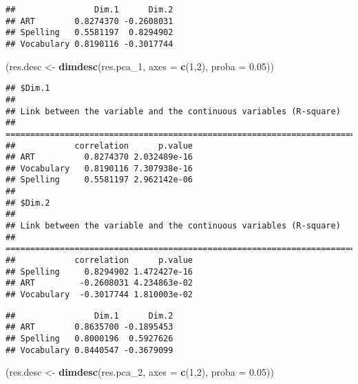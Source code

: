 \documentclass[
]{article}
\newenvironment{Shaded}{\begin{snugshade}}{\end{snugshade}}
\newcommand{\AttributeTok}[1]{\textcolor[rgb]{0.13,0.29,0.53}{#1}}
\newcommand{\DecValTok}[1]{\textcolor[rgb]{0.00,0.00,0.81}{#1}}
\newcommand{\FloatTok}[1]{\textcolor[rgb]{0.00,0.00,0.81}{#1}}
\newcommand{\FunctionTok}[1]{\textcolor[rgb]{0.13,0.29,0.53}{\textbf{#1}}}
\newcommand{\NormalTok}[1]{#1}
\newcommand{\OtherTok}[1]{\textcolor[rgb]{0.56,0.35,0.01}{#1}}
\newcommand{\SpecialCharTok}[1]{\textcolor[rgb]{0.81,0.36,0.00}{\textbf{#1}}}
\begin{document}
\begin{verbatim}
##                Dim.1      Dim.2
## ART        0.8274370 -0.2608031
## Spelling   0.5581197  0.8294902
## Vocabulary 0.8190116 -0.3017744
\end{verbatim}

\begin{Shaded}
\begin{Highlighting}[]
\NormalTok{(res.desc }\OtherTok{\textless{}{-}} \FunctionTok{dimdesc}\NormalTok{(res.pca\_1, }\AttributeTok{axes =} \FunctionTok{c}\NormalTok{(}\DecValTok{1}\NormalTok{,}\DecValTok{2}\NormalTok{), }\AttributeTok{proba =} \FloatTok{0.05}\NormalTok{))}
\end{Highlighting}
\end{Shaded}

\begin{verbatim}
## $Dim.1
## 
## Link between the variable and the continuous variables (R-square)
## =================================================================================
##            correlation      p.value
## ART          0.8274370 2.032489e-16
## Vocabulary   0.8190116 7.307938e-16
## Spelling     0.5581197 2.962142e-06
## 
## $Dim.2
## 
## Link between the variable and the continuous variables (R-square)
## =================================================================================
##            correlation      p.value
## Spelling     0.8294902 1.472427e-16
## ART         -0.2608031 4.234863e-02
## Vocabulary  -0.3017744 1.810003e-02
\end{verbatim}

\begin{Shaded}
\end{Shaded}

\begin{verbatim}
##                Dim.1      Dim.2
## ART        0.8635700 -0.1895453
## Spelling   0.8000196  0.5927626
## Vocabulary 0.8440547 -0.3679099
\end{verbatim}

\begin{Shaded}
\begin{Highlighting}[]
\NormalTok{(res.desc }\OtherTok{\textless{}{-}} \FunctionTok{dimdesc}\NormalTok{(res.pca\_2, }\AttributeTok{axes =} \FunctionTok{c}\NormalTok{(}\DecValTok{1}\NormalTok{,}\DecValTok{2}\NormalTok{), }\AttributeTok{proba =} \FloatTok{0.05}\NormalTok{))}
\end{Highlighting}
\end{Shaded}
\end{document}
